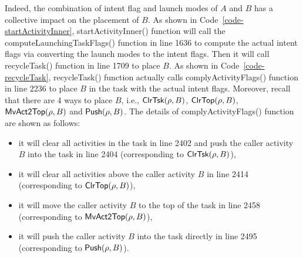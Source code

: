 {Indeed, the combination of intent flag and launch modes of $A$ and $B$ has a collective impact on the placement of $B$. As shown in Code~\ref{code-startActivityInner}, startActivityInner() function will call the computeLaunchingTaskFlags() function in line 1636 to compute the actual intent flags via converting the launch modes to the intent flags. Then it will call recycleTask() function in line 1709 to place $B$.
As shown in Code~\ref{code-recycleTask}, recycleTask() function actually calls complyActivityFlags() function in line 2236 to place $B$ in the task with the actual intent flags. Moreover, recall that there are 4 ways to place $B$, i.e., $\mathsf{ClrTsk}(\rho, B)$, $\mathsf{ClrTop}(\rho, B)$, $\mathsf{MvAct2Top}(\rho, B)$ and $\mathsf{Push}(\rho, B)$. The details of complyActivityFlags() function are shown as follows:
\begin{itemize}
    \item it will clear all activities in the task in line 2402 and push the caller activity $B$ into the task in line 2404 (corresponding to $\mathsf{ClrTsk}(\rho, B)$),
    \item it will clear all activities above the caller activity $B$ in line 2414 (corresponding to $\mathsf{ClrTop}(\rho, B)$),
    \item it will move the caller activity $B$ to the top of the task in line 2458 (corresponding to $\mathsf{MvAct2Top}(\rho, B)$),
    \item it will push the caller activity $B$ into the task directly in line 2495 (corresponding to $\mathsf{Push}(\rho, B)$).
\end{itemize}

}
